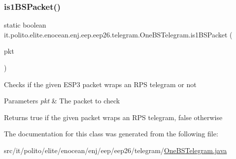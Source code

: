 \subsubsection{\texorpdfstring{is1\+B\+S\+Packet()}{is1BSPacket()}}
{\footnotesize\ttfamily static boolean it.\+polito.\+elite.\+enocean.\+enj.\+eep.\+eep26.\+telegram.\+One\+B\+S\+Telegram.\+is1\+B\+S\+Packet (\begin{DoxyParamCaption}\item[{\hyperlink{classit_1_1polito_1_1elite_1_1enocean_1_1protocol_1_1serial_1_1v3_1_1network_1_1packet_1_1_e_s_p3_packet}{E\+S\+P3\+Packet}}]{pkt }\end{DoxyParamCaption})\hspace{0.3cm}{\ttfamily [static]}}

Checks if the given E\+S\+P3 packet wraps an R\+PS telegram or not


\begin{DoxyParams}{Parameters}
{\em pkt} & The packet to check \\
\hline
\end{DoxyParams}
\begin{DoxyReturn}{Returns}
true if the given packet wraps an R\+PS telegram, false otherwise 
\end{DoxyReturn}


The documentation for this class was generated from the following file\+:\begin{DoxyCompactItemize}
\item 
src/it/polito/elite/enocean/enj/eep/eep26/telegram/\hyperlink{_one_b_s_telegram_8java}{One\+B\+S\+Telegram.\+java}\end{DoxyCompactItemize}
